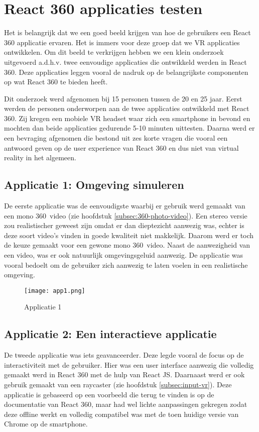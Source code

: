 \chapter{React 360 applicaties testen}
\label{ch:react-360-apps}
Het is belangrijk dat we een goed beeld krijgen van hoe de gebruikers een React 360 applicatie ervaren. Het is immers voor deze groep dat we VR applicaties ontwikkelen. Om dit beeld te verkrijgen hebben we een klein onderzoek uitgevoerd a.d.h.v. twee eenvoudige applicaties die ontwikkeld werden in React 360. Deze applicaties leggen vooral de nadruk op de belangrijkste componenten op wat React 360 te bieden heeft. 

Dit onderzoek werd afgenomen bij 15 personen tussen de 20 en 25 jaar. Eerst werden de personen onderworpen aan de twee applicaties ontwikkeld met React 360. Zij kregen een mobiele VR headset waar zich een smartphone in bevond en mochten dan beide applicaties gedurende 5-10 minuten uittesten. Daarna werd er een bevraging afgenomen die bestond uit zes korte vragen die vooral een antwoord geven op de user experience van React 360 en dus niet van virtual reality in het algemeen.

\section{Applicatie 1: Omgeving simuleren}
\label{sec:omgeving-simulatie}
De eerste applicatie was de eenvoudigste waarbij er gebruik werd gemaakt van een mono 360\textdegree\ video (zie hoofdstuk \ref{subsec:360-photo-video}). Een stereo versie zou realistischer geweest zijn omdat er dan dieptezicht aanwezig was, echter is deze soort video's vinden in goede kwaliteit niet makkelijk. Daarom werd er toch de keuze gemaakt voor een gewone mono 360\textdegree\ video. Naast de aanwezigheid van een video, was er ook natuurlijk omgevingsgeluid aanwezig. De applicatie was vooral bedoelt om de gebruiker zich aanwezig te laten voelen in een realistische omgeving.

\begin{figure}[H]
	\centering
	\texttt{[image: app1.png]}
	\caption{Applicatie 1}
	\label{fig:app1}
\end{figure}

\section{Applicatie 2: Een interactieve applicatie}
\label{sec:interactieve-applicatie}
De tweede applicatie was iets geavanceerder. Deze legde vooral de focus op de interactiviteit met de gebruiker. Hier was een user interface aanwezig die volledig gemaakt werd in React 360 met de hulp van React JS. Daarnaast werd er ook gebruik gemaakt van een raycaster (zie hoofdstuk \ref{subsec:input-vr}). Deze applicatie is gebaseerd op een voorbeeld die terug te vinden is op de documentatie van React 360, maar had wel lichte aanpassingen gekregen zodat deze offline werkt en volledig compatibel was met de toen huidige versie van Chrome op de smartphone.

